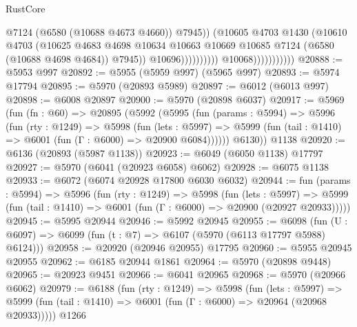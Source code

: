 \begin{lexlean}{RustCore}
\begin{coremodule}
                                                @7124
                                                (@6580 (@10688 @4673 @4660))
                                                @7945))
                                            (@10605
                                              @4703
                                              @1430
                                              (@10610
                                                @4703
                                                (@10625
                                                  @4683
                                                  @4698
                                                  @10634
                                                  @10663
                                                  @10669
                                                  @10685
                                                  @7124
                                                  (@6580 (@10688 @4698 @4684))
                                                  @7945))
                                              @10696))))))))))
                          @10068)))))))))))
@20888 := @5953 @997
@20892 := @5955 (@5959 @997) (@5965 @997)
@20893 := @5974 @17794
@20895 := @5970 (@20893 @5989)
@20897 := @6012 (@6013 @997)
@20898 := @6008 @20897
@20900 := @5970 (@20898 @6037)
@20917 := @5969
    (fun (fn : @60) =>
    @20895
      (@5992
        (@5995
          (fun (params : @5994) =>
          @5996
            (fun (rty : @1249) =>
            @5998
              (fun (lets : @5997) =>
              @5999 (fun (tail : @1410) => @6001 (fun (Γ : @6000) => @20900 @6084))))))
        @6130))
    @1138
@20920 := @6136 (@20893 (@5987 @1138))
@20923 := @6049 (@6050 @1138) @17797
@20927 := @5970 (@6041 (@20923 @6058) @6062)
@20928 := @6075 @1138
@20933 := @6072 (@6074 @20928 @17800 @6030 @6032)
@20944 := fun (params : @5994) =>
  @5996
    (fun (rty : @1249) =>
    @5998
      (fun (lets : @5997) =>
      @5999 (fun (tail : @1410) => @6001 (fun (Γ : @6000) => @20900 (@20927 @20933)))))
@20945 := @5995 @20944
@20946 := @5992 @20945
@20955 := @6098
    (fun (U : @6097) => @6099 (fun (t : @7) => @6107 (@5970 (@6113 @17797 @5988) @6124)))
@20958 := @20920 (@20946 @20955) @17795
@20960 := @5955 @20945 @20955
@20962 := @6185 @20944 @1861
@20964 := @5970 (@20898 @9448)
@20965 := @20923 @9451
@20966 := @6041 @20965
@20968 := @5970 (@20966 @6062)
@20979 := @6188
    (fun (rty : @1249) =>
    @5998
      (fun (lets : @5997) =>
      @5999 (fun (tail : @1410) => @6001 (fun (Γ : @6000) => @20964 (@20968 @20933)))))
    @1266

\end{coremodule}
\end{lexlean}
